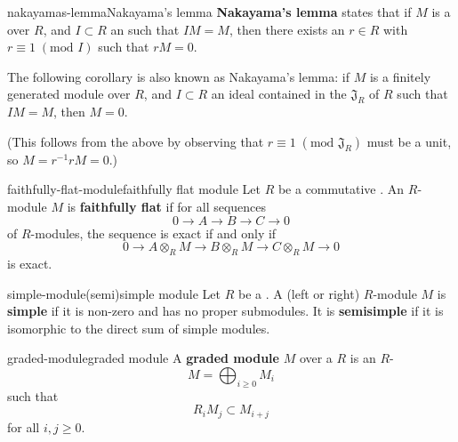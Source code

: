 \begin{topic}{nakayamas-lemma}{Nakayama's lemma}
    \textbf{Nakayama's lemma} states that if $M$ is a  over $R$, and $I \subset R$ an  such that $IM = M$, then there exists an $r \in R$ with $r \equiv 1 \; (\text{mod } I)$ such that $rM = 0$.
    
    The following corollary is also known as Nakayama's lemma: if $M$ is a finitely generated module over $R$, and $I \subset R$ an ideal contained in the  $\mathfrak{J}_R$ of $R$ such that $IM = M$, then $M = 0$.
    
    (This follows from the above by observing that $r \equiv 1 \; (\text{mod } \mathfrak{J}_R)$ must be a unit, so $M = r^{-1} r M = 0$.)
\end{topic}

\begin{topic}{faithfully-flat-module}{faithfully flat module}
    Let $R$ be a commutative . An $R$-module $M$ is \textbf{faithfully flat} if for all sequences
    \[ 0 \to A \to B \to C \to 0 \]
    of $R$-modules, the sequence is exact if and only if
    \[ 0 \to A \otimes_R M \to B \otimes_R M \to C \otimes_R M \to 0 \]
    is exact.
\end{topic}

\begin{topic}{simple-module}{(semi)simple module}
    Let $R$ be a . A (left or right) $R$-module $M$ is \textbf{simple} if it is non-zero and has no proper submodules. It is \textbf{semisimple} if it is isomorphic to the direct sum of simple modules.
\end{topic}

\begin{topic}{graded-module}{graded module}
    A \textbf{graded module} $M$ over a  $R$ is an $R$-
    \[ M = \bigoplus_{i \ge 0} M_i \]
    such that
    \[ R_i M_j \subset M_{i + j} \]
    for all $i, j \ge 0$.
\end{topic}
